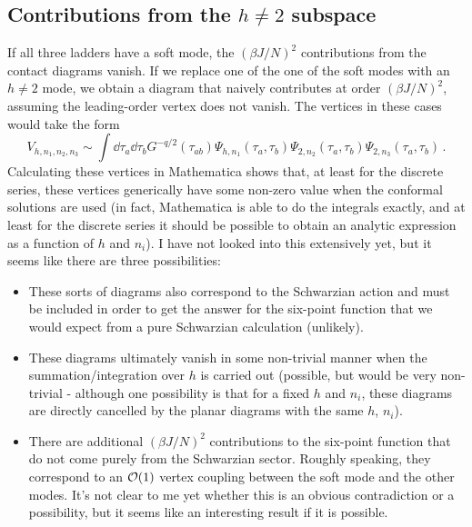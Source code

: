 \documentclass[aps,prx,preprint,onecolumn,citeautoscript,footinbib]{revtex4-1}
\begin{document}
\subsection{Contributions from the $h \neq 2$ subspace}
If all three ladders have a soft mode, the $(\beta J/N)^2$ contributions from the contact diagrams vanish. If we replace one of the one of the soft modes with an $h \neq 2$ mode, we obtain a diagram that naively contributes at order $(\beta J/N)^2$, assuming the leading-order vertex does not vanish. The vertices in these cases would take the form
\begin{equation}
    V_{h, n_1, n_2, n_3} \sim \int \dd{\tau_a} \dd{\tau_b} G^{-q/2}(\tau_{ab}) \Psi_{h, n_1}(\tau_a, \tau_b) \Psi_{2, n_2}(\tau_a, \tau_b) \Psi_{2, n_3}(\tau_a, \tau_b)\,.
    \label{eq:contactVertexhneq2}
\end{equation}
Calculating these vertices in Mathematica shows that, at least for the discrete series, these vertices generically have some non-zero value when the conformal solutions are used (in fact, Mathematica is able to do the integrals exactly, and at least for the discrete series it should be possible to obtain an analytic expression as a function of $h$ and $n_i$). I have not looked into this extensively yet, but it seems like there are three possibilities:
\begin{itemize}
    \item These sorts of diagrams also correspond to the Schwarzian action and must be included in order to get the answer for the six-point function that we would expect from a pure Schwarzian calculation (unlikely).
    \item These diagrams ultimately vanish in some non-trivial manner when the summation/integration over $h$ is carried out (possible, but would be very non-trivial - although one possibility is that for a fixed $h$ and $n_i$, these diagrams are directly cancelled by the planar diagrams with the same $h$, $n_i$).
    \item There are additional $(\beta J/N)^2$ contributions to the six-point function that do not come purely from the Schwarzian sector. Roughly speaking, they correspond to an $\order{1}$ vertex coupling between the soft mode and the other modes. It's not clear to me yet whether this is an obvious contradiction or a possibility, but it seems like an interesting result if it is possible.
\end{itemize}
\end{document}
